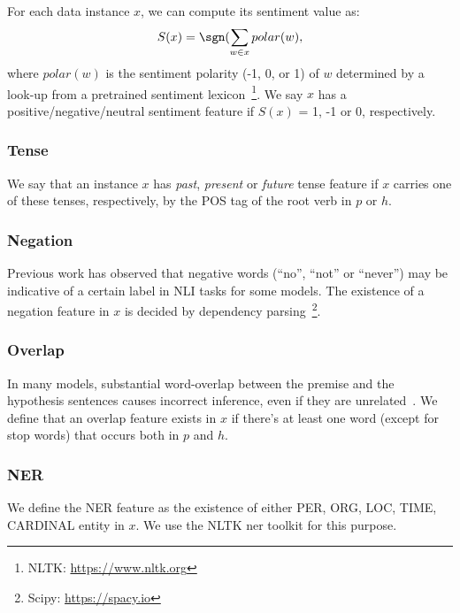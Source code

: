 For each data instance $x$, we can compute its sentiment value as:
\begin{equation}
S(x) = \sgn(\sum_{w \in x} polar(w),
\end{equation}
where $polar(w)$ is the sentiment polarity (-1, 0, or 1)
of $w$ determined by a look-up from a pretrained sentiment 
lexicon~\footnote{NLTK: \url{https://www.nltk.org}}.
We say $x$ has a positive/negative/neutral sentiment feature if $S(x)$ = 1, -1 or 0,
respectively.

\subsubsection{Tense}
We say that an instance $x$ has  
\textit{past}, \textit{present} or \textit{future} tense feature if $x$
carries one of these tenses, respectively, by the POS tag of the root verb
in $p$ or $h$. 

\subsubsection{Negation}
Previous work has observed that negative words (``no'', ``not'' or ``never'') 
may be indicative of a certain label in NLI tasks for some models.
The existence of a negation feature in $x$ is decided by dependency 
parsing~\footnote{Scipy: \url{https://spacy.io}}. 

\subsubsection{Overlap}
In many models, substantial word-overlap between the premise and the
hypothesis sentences causes incorrect inference, 
even if they are unrelated~\cite{mccoy2019right}. 
We define that an overlap feature exists in $x$ if there's at least one word
(except for stop words) that occurs both in $p$ and $h$. 

\subsubsection{NER}
We define the NER feature as the existence of either PER,
ORG, LOC, TIME, CARDINAL entity in $x$.
We use the NLTK ner toolkit for this purpose. 


